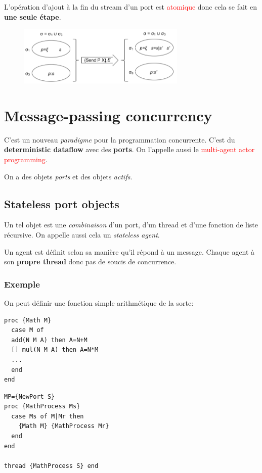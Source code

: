 \documentclass{report}
\begin{document}
L'opération d'ajout à la fin du stream d'un port est \textcolor{red}{atomique} donc cela se fait en \textbf{une seule étape}.

\begin{figure}[H]
\centering
\includegraphics[width=8cm]{img/semantiquePort.png}
\end{figure}

\section{Message-passing concurrency}
C'est un nouveau \textit{paradigme} pour la programmation concurrente. C'est du \textbf{deterministic dataflow} avec des \textbf{ports}. On l'appelle aussi le \textcolor{red}{multi-agent actor programming}.\par 
On a des objets \textit{ports} et des objets \textit{actifs}.

\subsection{Stateless port objects} \label{spo}
Un tel objet est une \textit{combinaison} d'un port, d'un thread et d'une fonction de liste récursive. On appelle aussi cela un \textit{stateless agent}. \par 
Un agent est définit selon sa manière qu'il répond à un message. Chaque agent à son \textbf{propre thread} donc pas de soucis de concurrence.

\subsubsection{Exemple}
On peut définir une fonction simple arithmétique de la sorte:

\begin{lstlisting}[escapechar=\%]
proc {Math M} 
  case M of 
  add(N M A) then A=N+M 
  [] mul(N M A) then A=N*M 
  ... 
  end
end
\end{lstlisting} 
\begin{lstlisting}[escapechar=\%]
MP={NewPort S} 
proc {MathProcess Ms} 
  case Ms of M|Mr then 
    {Math M} {MathProcess Mr}
  end
end

thread {MathProcess S} end
\end{lstlisting}
\end{document}
